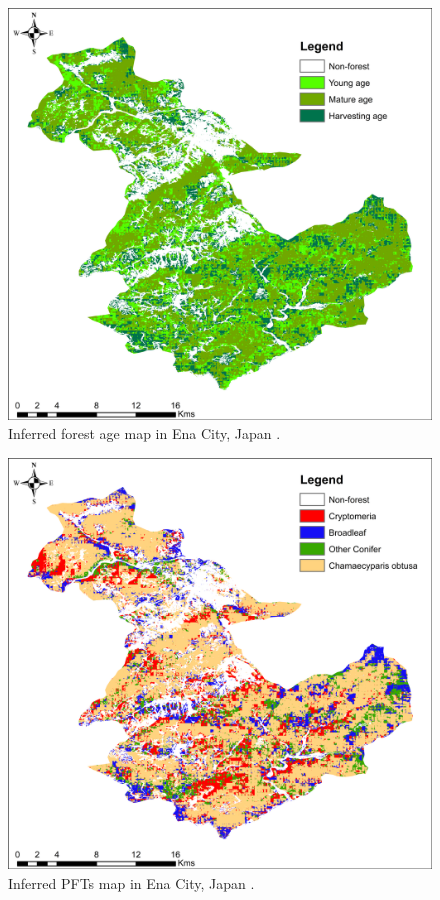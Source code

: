 \begin{figure}[tbh!]
    \centering
    \includegraphics[width=.9\textwidth]{figs/chap5/age_map.png}
    \caption[Inferred forest age map in Ena City]{Inferred forest age map in Ena City, Japan .}
    \label{fig:chap5_fig6}
\end{figure}

\begin{figure}[tbh!]
    \centering
    \includegraphics[width=.9\textwidth]{figs/chap5/spec_map.png}
    \caption[Inferred PFTs map in Ena City]{Inferred PFTs map in Ena City, Japan .}
    \label{fig:chap5_fig7}
\end{figure}


